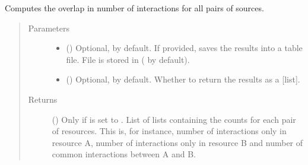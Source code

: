 \documentclass[letterpaper,10pt,english]{sphinxmanual}
\begin{document}
\begin{fulllineitems}
\begin{fulllineitems}
\end{fulllineitems}


\begin{fulllineitems}
\label{\detokenize{main:pypath.main.PyPath.sources_overlap}}
\end{fulllineitems}


\begin{fulllineitems}
\label{\detokenize{main:pypath.main.PyPath.sources_venn_data}}
Computes the overlap in number of interactions for all pairs of
sources.
\begin{quote}\begin{description}
\item[{Parameters}] \leavevmode\begin{itemize}
\item {} 
 () \textendash{} Optional,  by default. If provided, saves the
results into a table file. File is stored in
 ( by
default).

\item {} 
 () \textendash{} Optional,  by default. Whether to return the
results as a {[}list{]}.

\end{itemize}

\item[{Returns}] \leavevmode
() \textendash{} Only if  is set to . List
of lists containing the counts for each pair of resources.
This is, for instance, number of interactions only in
resource A, number of interactions only in resource B and
number of common interactions between A and B.

\end{description}\end{quote}


\end{fulllineitems}
\end{fulllineitems}
\end{document}
